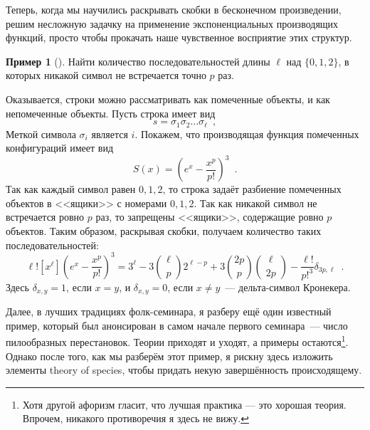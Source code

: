\documentclass[a5paper]{article}
\theoremstyle{definition}
\newtheorem{example}{Пример}
\begin{document}
Теперь, когда мы научились раскрывать скобки в бесконечном произведении, решим 
несложную задачку на применение экспоненциальных производящих функций, просто 
чтобы прокачать наше чувственное восприятие этих структур.

\begin{example}[{\cite[Пример 3.2.13, стр. 167]{gouldenjackson}}]
	Найти количество последовательностей длины \( \ell \) над \( \{ 0,1,2 \} 
	\), в которых никакой символ не встречается точно \( p \) раз.
	
	Оказывается, строки можно рассматривать как помеченные объекты, и как 
	непомеченные объекты. Пусть строка имеет вид
	\[
		s = \sigma_1 \sigma_2 \ldots \sigma_\ell  \enspace ,
	\]
	Меткой символа \( \sigma_i \) является \( i \). Покажем, что производящая 
	функция помеченных конфигураций имеет вид
	\[
		S(x) = \left(
			e^{x} - \dfrac{x^p}{p!}
		\right)^{3} \enspace .
	\]
	Так как каждый символ равен \( 0, 1, 2 \), то строка задаёт разбиение 
	помеченных объектов в <<ящики>> с номерами \( 0, 1, 2 \). Так как никакой 
	символ не встречается ровно \( p \) раз, то запрещены <<ящики>>, содержащие 
	ровно \( p \) объектов. Таким образом, раскрывая скобки, получаем 
	количество таких последовательностей:
	\[
		\ell! [x^\ell] \left(
					e^{x} - \dfrac{x^p}{p!}
				\right)^{3} = 3^{\ell} - 3 {\ell \choose p} 2^{\ell - p} + 3 
				{2p \choose p}{\ell \choose 2p} - \dfrac{\ell!}{p!^3} 
				\delta_{3p, \ell} \enspace .
	\]
	Здесь \( \delta_{x,y} = 1 \), если \( x = y \), и \( \delta_{x,y} = 0 \), 
	если \( x \neq y \)~--- дельта-символ Кронекера.
\end{example}

Далее, в лучших традициях фолк-семинара, я разберу ещё один известный пример, 
который был анонсирован в самом начале первого семинара~--- число пилообразных 
перестановок. Теории приходят и уходят, а примеры остаются\footnote{Хотя другой 
афоризм гласит, что лучшая практика --- это хорошая теория. Впрочем, никакого 
противоречия я здесь не вижу.}. Однако после того, как мы разберём этот пример, 
я рискну здесь изложить элементы theory of species, чтобы 
придать некую завершённость происходящему.
\end{document}
